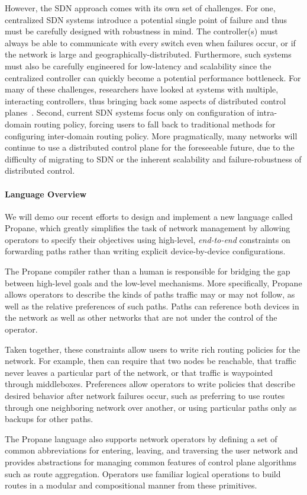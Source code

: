\documentclass[sigchi]{acmart}
\newcommand{\sysname}{{\small \sf Propane}\xspace}
\newcommand{\para}[1]{\paragraph*{\textbf{#1}}}
\begin{document}
However, the SDN approach comes with its own set of challenges. For one, centralized SDN systems introduce a potential single point of failure and thus must be carefully designed with robustness in mind. The controller(s) must always be able to communicate with every switch even when failures occur, or if the network is large and geographically-distributed. Furthermore, such systems must also be carefully engineered for low-latency and scalability since the centralized controller can quickly become a potential performance bottleneck. For many of these challenges, researchers have looked at systems with multiple, interacting controllers, thus bringing back some aspects of distributed
control planes~\cite{mccauley2013extending,onos}.
Second, current SDN systems focus only on configuration of intra-domain routing policy, forcing users to fall back to traditional methods for configuring inter-domain routing policy.
More pragmatically, many networks will continue to use a distributed control plane for the foreseeable future, due to the difficulty of migrating to SDN or the inherent scalability and failure-robustness of distributed control.

\para{Language Overview}
We will demo our recent efforts to design and
implement a new language called \sysname, which greatly simplifies the task of
network management by allowing operators to specify their objectives
using high-level, \emph{end-to-end} constraints on forwarding paths rather than writing explicit device-by-device configurations.

The \sysname compiler rather than a human is responsible for bridging the gap
between high-level goals and the low-level mechanisms.  More
specifically, \sysname allows operators to describe the kinds of paths
traffic may or may not follow, as well as the relative preferences of such paths.
Paths can reference both devices in the network as well as other networks that are not under the control of the operator. 

Taken together, these constraints allow users to write rich routing policies for the network. For example, then can require that two nodes be reachable, that traffic never leaves a particular part of the network, or that traffic is waypointed through middleboxes.
Preferences allow operators to write policies that describe desired behavior after network failures occur, such as preferring to use routes through one neighboring network over another, or using particular paths only as backups for other paths.

The \sysname language also supports network operators by defining a
set of common abbreviations for entering, leaving, and traversing
the user network and provides abstractions for managing common features of
control plane algorithms such as route aggregation.  
Operators use familiar logical operations to build routes in a modular and 
compositional manner from these primitives. 
\end{document}
